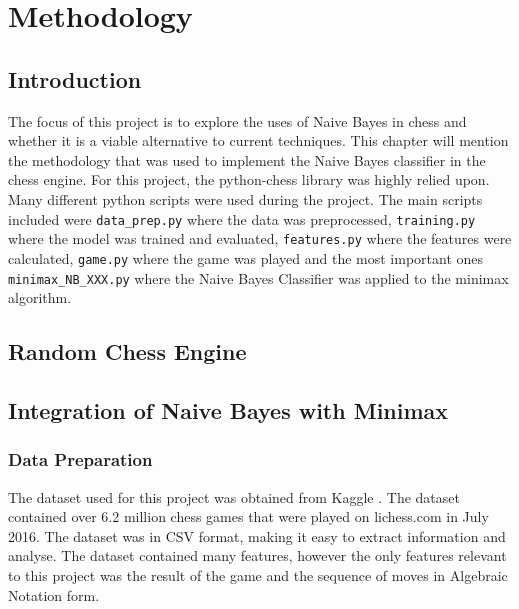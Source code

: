 \chapter{Methodology}

\section{Introduction}
The focus of this project is to explore the uses of Naive Bayes in chess and whether it is a viable alternative to current techniques. This chapter will mention the methodology that was used to implement the Naive Bayes classifier in the chess engine. For this project, the python-chess library was highly relied upon. Many different python scripts were used during the project. The main scripts included were \texttt{data\_prep.py} where the data was preprocessed, \texttt{training.py} where the model was trained and evaluated, \texttt{features.py} where the features were calculated, \texttt{game.py} where the game was played and the most important ones \texttt{minimax\_NB\_XXX.py} where the Naive Bayes Classifier was applied to the minimax algorithm.

\section{Random Chess Engine}

\section{Integration of Naive Bayes with Minimax}

\subsection{Data Preparation}

The dataset used for this project was obtained from Kaggle \cite{ChessGameDataset}. The dataset contained over 6.2 million chess games that were played on lichess.com in July 2016. The dataset was in CSV format, making it easy to extract information and analyse. The dataset contained many features, however the only features relevant to this project was the result of the game and the sequence of moves in Algebraic Notation form.

